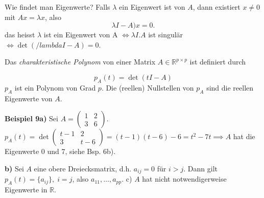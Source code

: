 \documentclass[12pt, a4paper]{article}
\theoremstyle{plain}
\theoremstyle{definition}
\newcommand{\R}{\mathbb{R}}
\newcommand{\1}{\mathds{1}}
\begin{document}
Wie findet man Eigenwerte? Falls $\lambda$ ein Eigenwert ist von $A$, dann existiert $x \neq 0$ mit $Ax = \lambda x$, also \[  \lambda I - A)x = 0. \]  das heisst $\lambda$ ist ein Eigenwert von A $\iff \lambda I . A$ ist singulär $\iff \det(/lambda I - A) = 0$.

Das \emph{charakteristische Polynom} von einer Matrix $A \in \R^{p \times p}$ ist definiert durch

\[   p_A (t) = \det(t I - A) \]
$p_A$ ist ein Polynom von Grad $p$. Die (reellen) Nullstellen von $p_A$ sind die reellen Eigenwerte von $A$.

\textbf{Beispiel 9a)} Sei $A =\begin{pmatrix} 1&2\\3&6    \end{pmatrix}$. $p_A(t) = \det \begin{pmatrix} t-1&2\\3& t-6    \end{pmatrix} = (t-1)(t-6)-6 = t^2 - 7t \implies A$ hat die Eigenwerte 0 und 7, siehe Bsp. 6b).

\textbf{b)} Sei $A$ eine obere Dreiecksmatrix, d.h. $a_{ij} = 0$ für $i > j$. Dann gilt $p_A (t) = \{ a_{ij} \}, \; i = j$, also $a_{11}, \ldots, a_{pp}$.
c) $A$ hat nicht notwendigerweise Eigenwerte in $\R$.
\end{document}
